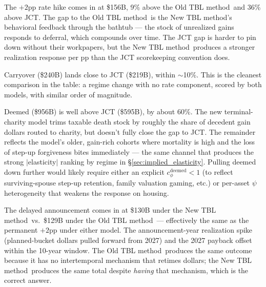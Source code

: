 \documentclass[11pt]{article}
\newcommand{\dyn}{New TBL method}
\newcommand{\oldm}{Old TBL method}
\begin{document}
The $+2$pp rate hike comes in at \$156B, 9\% above the \oldm\ and 36\%
above JCT. The gap to the \oldm\ is the \dyn's behavioral feedback
through the bathtub --- the stock of unrealized gains responds to
deferral, which compounds over time. The JCT gap is harder to pin down
without their workpapers, but the \dyn\ produces a stronger realization
response per pp than the JCT scorekeeping convention does.

Carryover (\$240B) lands close to JCT (\$219B), within $\sim$10\%. This
is the cleanest comparison in the table: a regime change with no rate
component, scored by both models, with similar order of magnitude.

Deemed (\$956B) is well above JCT (\$595B), by about 60\%. The new
terminal-charity model trims taxable death stock by roughly the share of
decedent gain dollars routed to charity, but doesn't fully close the gap
to JCT. The remainder reflects the model's older, gain-rich cohorts
where mortality is high and the loss of step-up forgiveness bites
immediately --- the same channel that produces the strong $|$elasticity$|$
ranking by regime in \S\ref{sec:implied_elasticity}. Pulling deemed down
further would likely require either an explicit $c_\phi^{\text{deemed}}
< 1$ (to reflect surviving-spouse step-up retention, family valuation
gaming, etc.) or per-asset $\psi$ heterogeneity that weakens the response
on housing.

The delayed announcement comes in at \$130B under the \dyn\ vs.\ \$129B
under the \oldm\ --- effectively the same as the permanent $+2$pp under
either model. The announcement-year realization spike (planned-bucket
dollars pulled forward from 2027) and the 2027 payback offset within the
10-year window. The \oldm\ produces the same outcome because it has no
intertemporal mechanism that retimes dollars; the \dyn\ produces the
same total despite \emph{having} that mechanism, which is the correct
answer.

\end{document}
